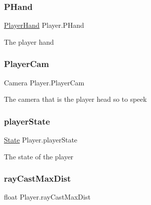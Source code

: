 \mbox{\label{class_player_add63756ae44fffede30732d219ed0410}} 
\subsubsection{\texorpdfstring{P\+Hand}{PHand}}
{\footnotesize\ttfamily \mbox{\hyperlink{class_player_hand}{Player\+Hand}} Player.\+P\+Hand}



The player hand 

\mbox{\label{class_player_af09423c3841ebcb3c1e77cf3fa1b0084}} 
\subsubsection{\texorpdfstring{Player\+Cam}{PlayerCam}}
{\footnotesize\ttfamily Camera Player.\+Player\+Cam}



The camera that is the player head so to speek 

\mbox{\label{class_player_a8b94069330ce05b42769d5cc61c6f00a}} 
\subsubsection{\texorpdfstring{player\+State}{playerState}}
{\footnotesize\ttfamily \mbox{\hyperlink{class_player_aa3b6104791d642173caf761cf81f8c08}{State}} Player.\+player\+State\hspace{0.3cm}{\ttfamily [private]}}



The state of the player 

\mbox{\label{class_player_a322b20647ba7b9c279006c4745f7eae9}} 
\subsubsection{\texorpdfstring{ray\+Cast\+Max\+Dist}{rayCastMaxDist}}
{\footnotesize\ttfamily float Player.\+ray\+Cast\+Max\+Dist\hspace{0.3cm}{\ttfamily [private]}}



